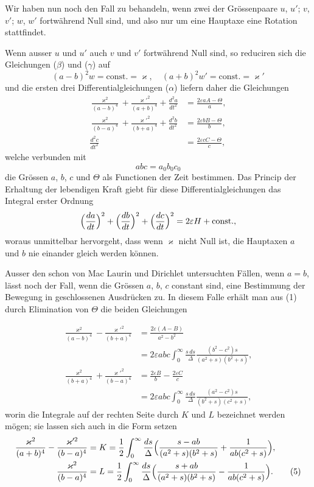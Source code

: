 \documentclass[12pt,a4paper]{book}
\theoremstyle{definition}
\theoremstyle{remark}
\begin{document}
Wir haben nun noch den Fall zu behandeln, wenn zwei der Gr\"ossenpaare $u$, $u'$; $v$, $v'$; $w$, $w'$ fortw\"ahrend Null sind, und also nur um eine Hauptaxe eine Rotation stattfindet.

Wenn ausser $u$ und $u'$ auch $v$ und $v'$ fortw\"ahrend Null sind, so reduciren sich die Gleichungen ($\beta$) und ($\gamma$) auf
\[
(a - b)^{2}w = \text{const.} = \varkappa,\quad (a + b)^{2}w' = \text{const.} = \varkappa'
\]
und die ersten drei Differentialgleichungen ($\alpha$) liefern daher die Gleichungen
\begin{align*}
\frac{\varkappa^{2}}{(a-b)^{4}} + \frac{\varkappa'^{2}}{(a+b)^{4}} + \frac{d^{2}a}{dt^{2}} &= \frac{2\varepsilon aA - \Theta}{a},\\
\frac{\varkappa^{2}}{(b-a)^{4}} + \frac{\varkappa'^{2}}{(b+a)^{4}} + \frac{d^{2}b}{dt^{2}} &= \frac{2\varepsilon bB - \Theta}{b},\\
\frac{d^{2}c}{dt^{2}} &= \frac{2\varepsilon cC - \Theta}{c},\tag{1}
\end{align*}
welche verbunden mit
\[
abc = a_{0}b_{0}c_{0}
\]
die Gr\"ossen $a$, $b$, $c$ und $\Theta$ als Functionen der Zeit bestimmen. Das Princip der Erhaltung der lebendigen Kraft giebt f\"ur diese Differentialgleichungen das Integral erster Ordnung
\[
\Bigl(\frac{da}{dt}\Bigr)^{2} + \Bigl(\frac{db}{dt}\Bigr)^{2} + \Bigl(\frac{dc}{dt}\Bigr)^{2} = 2\varepsilon H + \text{const.},
\]
woraus unmittelbar hervorgeht, dass wenn $\varkappa$ nicht Null ist, die Hauptaxen $a$ und $b$ nie einander gleich werden k\"onnen.

Ausser den schon von Mac Laurin und Dirichlet untersuchten F\"allen, wenn $a = b$, l\"asst noch der Fall, wenn die Gr\"ossen $a$, $b$, $c$ constant sind, eine Bestimmung der Bewegung in geschlossenen Ausdr\"ucken zu. In diesem Falle erh\"alt man aus (1) durch Elimination von $\Theta$ die beiden Gleichungen

\begin{align*}
\frac{\varkappa^{2}}{(a-b)^{4}} - \frac{\varkappa'^{2}}{(b+a)^{4}} &= \frac{2\varepsilon(A-B)}{a^{2}-b^{2}}\\
&= 2\varepsilon abc\int_{0}^{\infty}\frac{s\,ds}{\Delta}\frac{(b^{2}-c^{2})s}{(a^{2}+s)(b^{2}+s)},\\
\frac{\varkappa^{2}}{(b+a)^{4}} + \frac{\varkappa'^{2}}{(b-a)^{4}} &= \frac{2\varepsilon B}{b} - \frac{2\varepsilon C}{c}\\
&= 2\varepsilon abc\int_{0}^{\infty}\frac{s\,ds}{\Delta}\frac{(a^{2}-c^{2})s}{(b^{2}+s)(c^{2}+s)},\tag{3}
\end{align*}
worin die Integrale auf der rechten Seite durch $K$ und $L$ bezeichnet werden m\"ogen; sie lassen sich auch in die Form setzen
\begin{align*}
\frac{\varkappa^{2}}{(a+b)^{4}} - \frac{\varkappa'^{2}}{(b-a)^{4}} &= K = \frac{1}{2}\int_{0}^{\infty}\frac{ds}{\Delta}\Bigl(\frac{s - ab}{(a^{2}+s)(b^{2}+s)} + \frac{1}{ab(c^{2}+s)}\Bigr),\\
\frac{\varkappa^{2}}{(b-a)^{4}} &= L = \frac{1}{2}\int_{0}^{\infty}\frac{ds}{\Delta}\Bigl(\frac{s + ab}{(a^{2}+s)(b^{2}+s)} - \frac{1}{ab(c^{2}+s)}\Bigr).\tag{5}
\end{align*}
\end{document}
